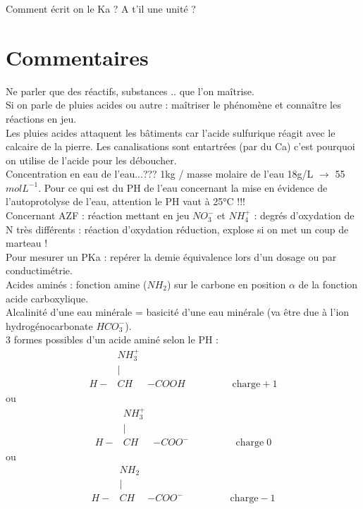\documentclass[12pt,prb,aps,epsf]{report}
\begin{document}
Comment écrit on le Ka ? A t'il une unité ?\\

\section*{Commentaires}
Ne parler que des réactifs, substances .. que l'on maîtrise.\\
Si on parle de pluies acides ou autre : maîtriser le phénomène et connaître les réactions en jeu.\\
Les pluies acides attaquent les bâtiments car l'acide sulfurique réagit avec le calcaire de la pierre. Les canalisations sont entartrées (par du Ca) c'est pourquoi on utilise de l'acide pour les déboucher.\\
Concentration en eau de l'eau...??? 1kg / masse molaire de l'eau 18g/L $\rightarrow$ 55 $molL^{-1}$.
Pour ce qui est du PH de l'eau concernant la mise en évidence de l'autoprotolyse de l'eau, attention le PH vaut à 25°C !!!\\
Concernant AZF : réaction mettant en jeu $NO_3^{-}$ et $NH_4^+$  : degrés d'oxydation de N très différents : réaction d'oxydation réduction, explose si on met un coup de marteau !\\
Pour mesurer un PKa : repérer la demie équivalence lors d'un dosage ou par conductimétrie.\\
Acides aminés : fonction amine ($NH_2$) sur le carbone en position $\alpha$ de la fonction acide carboxylique.\\
Alcalinité d'une eau minérale = basicité d'une eau minérale (va être due à l'ion hydrogénocarbonate $HCO_3^-$).\\
3 formes possibles d'un acide aminé selon le PH :
\begin{eqnarray*}
&NH_3^+&\\
&|&\\
H-&CH&-COOH\hspace{2cm}\mathrm{charge} +1
\end{eqnarray*}
ou
\begin{eqnarray*}
&NH_3^+&\\
&|&\\
H-&CH&-COO^- \hspace{2cm}\mathrm{charge}\; 0
\end{eqnarray*}
ou
\begin{eqnarray*}
&NH_2&\\
&|&\\
H-&CH&-COO^- \hspace{2cm}\mathrm{charge} -1
\end{eqnarray*}
\end{document}
